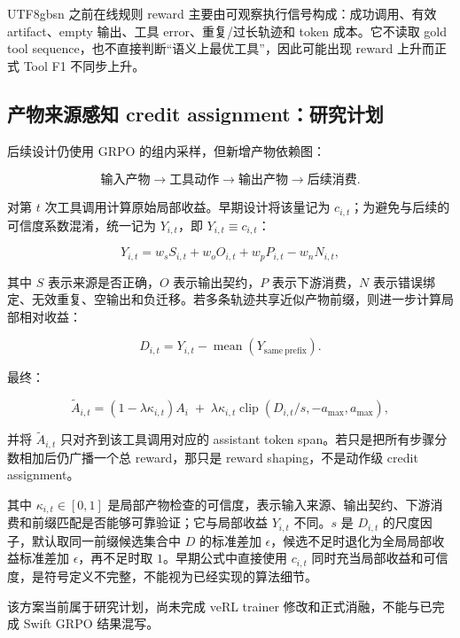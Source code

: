 \documentclass[a4paper,11pt]{article}
\begin{document}
\begin{CJK*}{UTF8}{gbsn}
之前在线规则 reward 主要由可观察执行信号构成：成功调用、有效 artifact、empty 输出、工具 error、重复/过长轨迹和 token 成本。它不读取 gold tool sequence，也不直接判断“语义上最优工具”，因此可能出现 reward 上升而正式 Tool F1 不同步上升。

\subsection{产物来源感知 credit assignment：研究计划}

后续设计仍使用 GRPO 的组内采样，但新增产物依赖图：

\[
\text{输入产物}\rightarrow\text{工具动作}\rightarrow\text{输出产物}\rightarrow\text{后续消费}.
\]

对第 $t$ 次工具调用计算原始局部收益。早期设计将该量记为 $c_{i,t}$；为避免与后续的可信度系数混淆，统一记为 $Y_{i,t}$，即 $Y_{i,t}\equiv c_{i,t}$：

\begin{equation}
Y_{i,t}=w_sS_{i,t}+w_oO_{i,t}+w_pP_{i,t}-w_nN_{i,t},
\end{equation}

其中 $S$ 表示来源是否正确，$O$ 表示输出契约，$P$ 表示下游消费，$N$ 表示错误绑定、无效重复、空输出和负迁移。若多条轨迹共享近似产物前缀，则进一步计算局部相对收益：

\begin{equation}
D_{i,t}=Y_{i,t}-\operatorname{mean}(Y_{\mathrm{same\ prefix}}).
\end{equation}

最终：

\begin{equation}
\widetilde A_{i,t}
=(1-\lambda\kappa_{i,t})A_i
\;+\;\lambda\kappa_{i,t}
\operatorname{clip}(D_{i,t}/s,-a_{\max},a_{\max}),
\end{equation}

并将 $\widetilde A_{i,t}$ 只对齐到该工具调用对应的 assistant token span。若只是把所有步骤分数相加后仍广播一个总 reward，那只是 reward shaping，不是动作级 credit assignment。

其中 $\kappa_{i,t}\in[0,1]$ 是局部产物检查的可信度，表示输入来源、输出契约、下游消费和前缀匹配是否能够可靠验证；它与局部收益 $Y_{i,t}$ 不同。$s$ 是 $D_{i,t}$ 的尺度因子，默认取同一前缀候选集合中 $D$ 的标准差加 $\epsilon$，候选不足时退化为全局局部收益标准差加 $\epsilon$，再不足时取 $1$。早期公式中直接使用 $c_{i,t}$ 同时充当局部收益和可信度，是符号定义不完整，不能视为已经实现的算法细节。

该方案当前属于研究计划，尚未完成 veRL trainer 修改和正式消融，不能与已完成 Swift GRPO 结果混写。


\end{CJK*}
\end{document}
